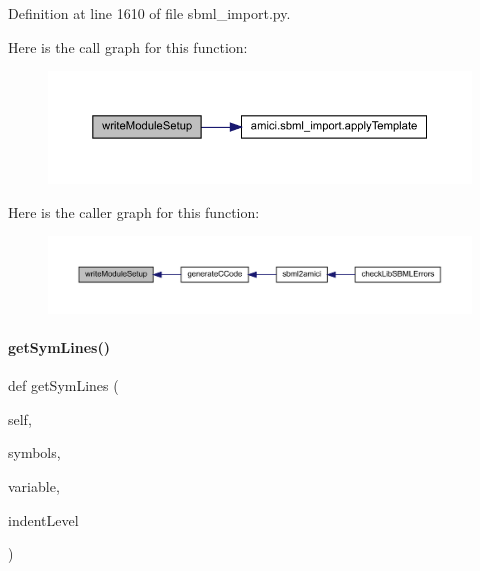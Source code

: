 Definition at line 1610 of file sbml\+\_\+import.\+py.

Here is the call graph for this function\+:
\nopagebreak
\begin{figure}[H]
\begin{center}
\leavevmode
\includegraphics[width=350pt]{classamici_1_1sbml__import_1_1_sbml_importer_a6398e5d904f66bf528047fdc48d50ae7_cgraph}
\end{center}
\end{figure}
Here is the caller graph for this function\+:
\nopagebreak
\begin{figure}[H]
\begin{center}
\leavevmode
\includegraphics[width=350pt]{classamici_1_1sbml__import_1_1_sbml_importer_a6398e5d904f66bf528047fdc48d50ae7_icgraph}
\end{center}
\end{figure}
\mbox{\label{classamici_1_1sbml__import_1_1_sbml_importer_a643f1be0c51c64c039480823a43bf800}} 
\paragraph{\texorpdfstring{get\+Sym\+Lines()}{getSymLines()}}
{\footnotesize\ttfamily def get\+Sym\+Lines (\begin{DoxyParamCaption}\item[{}]{self,  }\item[{}]{symbols,  }\item[{}]{variable,  }\item[{}]{indent\+Level }\end{DoxyParamCaption})}


